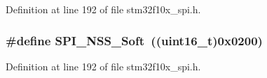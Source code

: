 Definition at line 192 of file stm32f10x\+\_\+spi.\+h.

\subsubsection[{\texorpdfstring{S\+P\+I\+\_\+\+N\+S\+S\+\_\+\+Soft}{SPI_NSS_Soft}}]{\setlength{\rightskip}{0pt plus 5cm}\#define S\+P\+I\+\_\+\+N\+S\+S\+\_\+\+Soft~(({\bf uint16\+\_\+t})0x0200)}\hypertarget{group___s_p_i___slave___select__management_ga105969ee7eb635414da35b41e942e383}{}\label{group___s_p_i___slave___select__management_ga105969ee7eb635414da35b41e942e383}


Definition at line 192 of file stm32f10x\+\_\+spi.\+h.

